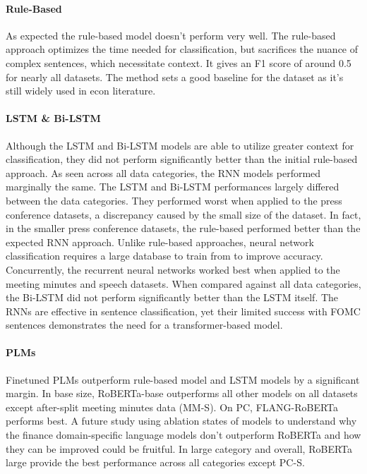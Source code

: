 \documentclass[11pt]{article}
\begin{document}
\paragraph{Rule-Based}
As expected the rule-based model doesn't perform very well. The rule-based approach optimizes the time needed for classification, but sacrifices the nuance of complex sentences, which necessitate context. It gives an F1 score of around 0.5 for nearly all datasets. The method sets a good baseline for the dataset as it's still widely used in econ literature. 

\paragraph{LSTM \& Bi-LSTM}
Although the LSTM and Bi-LSTM models are able to utilize greater context for classification, they did not perform significantly better than the initial rule-based approach. As seen across all data categories, the RNN models performed marginally the same. The LSTM and Bi-LSTM performances largely differed between the data categories. They performed worst when applied to the press conference datasets, a discrepancy caused by the small size of the dataset. In fact, in the smaller press conference datasets, the rule-based
performed better than the expected RNN approach. Unlike rule-based approaches, neural network classification requires a large database to train from to improve accuracy.
Concurrently, the recurrent neural networks worked best when applied to the meeting minutes and speech datasets. When compared against all data categories, the Bi-LSTM did not perform significantly better than the LSTM itself. The RNNs are effective in sentence classification, yet their limited success with FOMC sentences demonstrates the need for a transformer-based model.

\paragraph{PLMs} 
Finetuned PLMs outperform rule-based model and LSTM models by a significant margin. In base size, RoBERTa-base outperforms all other models on all datasets except after-split meeting minutes data (MM-S). On PC, FLANG-RoBERTa performs best. A future study using ablation states of models to understand why the finance domain-specific language models don't outperform RoBERTa and how they can be improved could be fruitful. In large category and overall, RoBERTa large provide the best performance across all categories except PC-S.  
\end{document}
